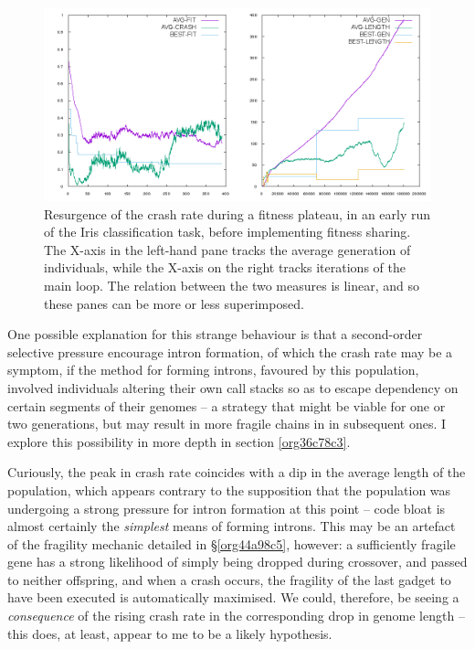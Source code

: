 \documentclass[12pt,glossary]{dalthesis}
\begin{document}
\begin{figure}[htbp]
\centering
\includegraphics[width=.9\linewidth]{../images/plots/good-nosharing.png}
\caption{\label{fig:org8f45230}
Resurgence of the crash rate during a fitness plateau, in an early run of the Iris classification task, before implementing fitness sharing. The X-axis in the left-hand pane tracks the average generation of individuals, while the X-axis on the right tracks iterations of the main loop. The relation between the two measures is linear, and so these panes can be more or less superimposed.}
\end{figure}

One possible explanation for this strange behaviour is that a second-order selective
pressure encourage intron formation, of which the crash rate may be a symptom,
if the method for forming introns, favoured by this population, involved individuals
altering their own call stacks so as to escape dependency on certain segments of their
genomes -- a strategy that might be viable for one or two generations, but may result
in more fragile chains in in subsequent ones. I explore this possibility in more
depth in section \ref{org36c78c3}.

Curiously, the peak in crash rate coincides with a dip in the average length of the
population, which appears contrary to the supposition that the population was undergoing
a strong pressure for intron formation at this point -- code bloat is almost certainly
the \emph{simplest} means of forming introns. This may be an artefact of the fragility
mechanic detailed in \S \ref{org44a98c5}, however: a sufficiently fragile gene
has a strong likelihood of simply being dropped during crossover, and passed to neither
offspring, and when a crash occurs, the fragility of the last gadget to have been
executed is automatically maximised. We could, therefore, be seeing a \emph{consequence}
of the rising crash rate in the corresponding drop in genome length -- this does, at
least, appear to me to be a likely hypothesis.
\end{document}
